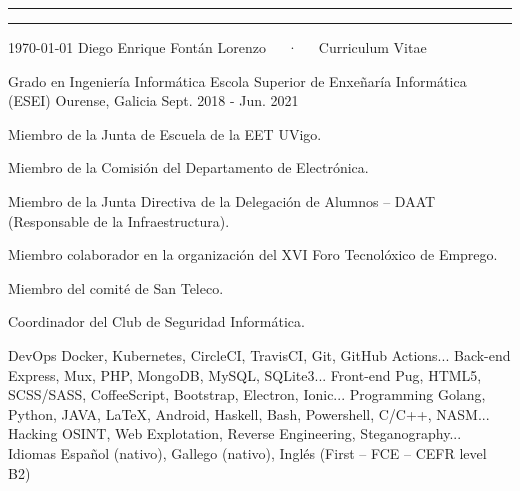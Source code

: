 \documentclass[11pt, a4paper]{style}
\begin{document}
\noindent\rule{\textwidth}{0pt}
\noindent\rule{\textwidth}{0pt}
\makecvheader
\makecvfooter
  {\today}
  {Diego Enrique Fontán Lorenzo~~~·~~~Curriculum Vitae}
  {\thepage}
\begin{cventries}
  \cventry
    {Grado en Ingeniería Informática} %
    {Escola Superior de Enxeñaría Informática (ESEI)} %
    {Ourense, Galicia} %
    {Sept. 2018 - Jun. 2021} %
    {
        \begin{cvitems} %
            \item {Miembro de la Junta de Escuela de la EET UVigo.}
            \item {Miembro de la Comisión del Departamento de Electrónica.}
            \item {Miembro de la Junta Directiva de la Delegación de Alumnos – DAAT (Responsable de la Infraestructura).}
            \item {Miembro colaborador en la organización del XVI Foro Tecnolóxico de Emprego.}
            \item {Miembro del comité de San Teleco.}
            \item {Coordinador del Club de Seguridad Informática.}
      \end{cvitems}
    }
\end{cventries}
\begin{cvskills}
  \cvskill
    {DevOps} %
    {Docker, Kubernetes, CircleCI, TravisCI, Git, GitHub Actions...} %
  \cvskill
    {Back-end} %
    {Express, Mux, PHP, MongoDB, MySQL, SQLite3...} %
  \cvskill
    {Front-end} %
    {Pug, HTML5, SCSS/SASS, CoffeeScript, Bootstrap, Electron, Ionic...} %
  \cvskill
    {Programming} %
    {Golang, Python, JAVA, \LaTeX, Android, Haskell, Bash, Powershell, C/C++, NASM...} %
  \cvskill
    {Hacking} %
    {OSINT, Web Explotation, Reverse Engineering, Steganography...} %
  \cvskill
    {Idiomas} %
    {Español (nativo), Gallego (nativo), Inglés (First – FCE – CEFR level B2)} %
\end{cvskills}
\end{document}
